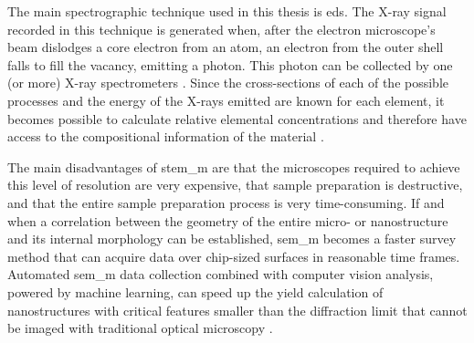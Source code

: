The main spectrographic technique used in this thesis is \acs{eds}. The X-ray signal recorded in this technique is generated when, after the electron microscope's beam dislodges a core electron from an atom, an electron from the outer shell falls to fill the vacancy, emitting a photon. This photon can be collected by one (or more) X-ray spectrometers \cite{EBNESAJJAD201439}. Since the cross-sections of each of the possible processes and the energy of the X-rays emitted are known for each element, it becomes possible to calculate relative elemental concentrations and therefore have access to the compositional information of the material \cite{Amari2012}.

The main disadvantages of \acs{stem_m} are that the microscopes required to achieve this level of resolution are very expensive, that sample preparation is destructive, and that the entire sample preparation process is very time-consuming. If and when a correlation between the geometry of the entire micro- or nanostructure and its internal morphology can be established, \acf{sem_m} becomes a faster survey method that can acquire data over chip-sized surfaces in reasonable time frames. Automated \acs{sem_m} data collection combined with computer vision analysis, powered by machine learning, can speed up the yield calculation of nanostructures with critical features smaller than the diffraction limit that cannot be imaged with traditional optical microscopy \cite{Lin2022, Modarres2017, Lee2020}.